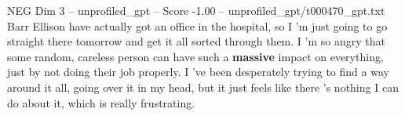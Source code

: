 \begin{textsample}{NEG Dim 3 – unprofiled\_gpt – Score -1.00 – unprofiled\_gpt/t000470\_gpt.txt}  \label{ex:f3_neg_006}
Barr Ellison have actually got an office in the hospital, so I ’m just going to go straight there tomorrow and get it all sorted through them.
I ’m so angry that some random, careless person can have such a \textbf{massive} impact on everything, just by not doing their job properly.
I ’ve been desperately trying to find a way around it all, going over it in my head, but it just feels like there ’s nothing I can do about it, which is really frustrating.

\end{textsample}
